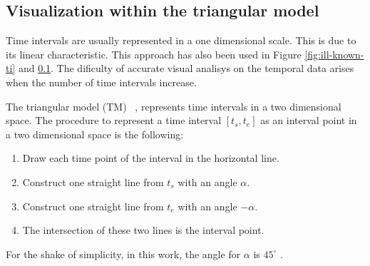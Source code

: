 \subsection{\label{subsec:visualization-tm}Visualization within the triangular model}
Time intervals are usually represented in a one dimensional scale. This is due to its linear characteristic. This approach has also been used in Figure \ref{fig:ill-known-ti} and \ref{}. The dificulty of accurate visual analisys on the temporal data arises when the number of time intervals increase. 

The triangular model (TM) ~\cite{Kulpa1997}, \cite{Weghe2007} represents time intervals in a two dimensional space. The procedure to represent a time interval $[t_s, t_e]$ as an interval point in a two dimensional space is the following:

\begin{enumerate}
 \item Draw each time point of the interval in the horizontal line.
\item Construct one straight line from $t_s$ with an angle $\alpha$.
\item Construct one straight line from $t_e$ with an angle $-\alpha$.
\item The intersection of these two lines is the interval point.
\end{enumerate}

For the shake of simplicity, in this work, the angle for $\alpha$ is $45^{\circ}$ .



